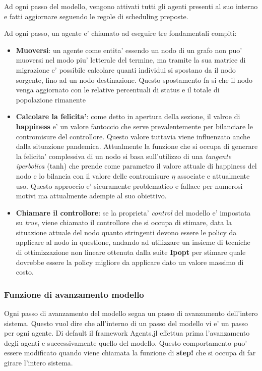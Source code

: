 Ad ogni passo del modello, vengono attivati tutti gli agenti presenti al suo interno e 
fatti aggiornare seguendo le regole di scheduling preposte. 

Ad ogni passo, un agente e' chiamato ad eseguire tre fondamentali compiti:
\begin{itemize}
	\item \textbf{Muoversi}: un agente come entita' essendo un nodo di un grafo non puo'
	muoversi nel modo piu' letterale del termine, ma tramite la sua matrice di migrazione 
	e' possibile calcolare quanti individui si spostano da il nodo sorgente, fino ad un nodo
	destinazione. Questo spostamento fa si che il nodo venga aggiornato con le relative percentuali
	di status e il totale di popolazione rimanente
	\item \textbf{Calcolare la felicita'}: come detto in apertura della sezione, il valroe di \textbf{happiness}
	e' un valore fantoccio che serve prevalentemente per bilanciare le contromisure del controllore.
	Questo valore tuttavia viene influenzato anche dalla situazione pandemica. Attualmente la funzione che si occupa di generare la felicita' complessiva di un nodo si basa
	sull'utilizzo di una \emph{tangente iperbolica} (tanh) che prende come parametro il valore attuale
	di happiness del nodo e lo bilancia con il valore delle contromisure $\eta$ associate e attualmente 
	uso. Questo approccio e' sicuramente problematico e fallace per numerosi motivi ma attualmente 
	adempie al suo obiettivo.
	\item \textbf{Chiamare il controllore}: se la proprieta' \emph{control} del modello e' impostata su
	\emph{true}, viene chiamato il controllore che si occupa di stimare, data la situazione attuale del nodo
	quanto stringenti devono essere le policy da applicare al nodo in questione, andando ad utilizzare
	un insieme di tecniche di ottimizzazione non lineare ottenuta dalla suite \textbf{Ipopt} per 
	stimare quale dovrebbe essere la policy migliore da applicare dato un valore massimo di costo.
\end{itemize}

\subsubsection{Funzione di avanzamento modello}
Ogni passo di avanzamento del modello segna un passo di avanzamento dell'intero sistema. 
Questo vuol dire che all'interno di un passo del modello vi e' un passo per ogni agente. Di default
il framework Agents.jl effettua prima l'avanzamento degli agenti e successivamente quello del modello.
Questo comportamento puo' essere modificato quando viene chiamata la funzione di \textbf{step!} che 
si occupa di far girare l'intero sistema.

